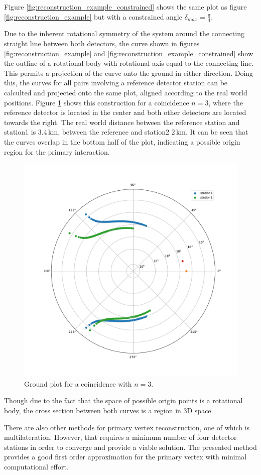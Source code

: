 \documentclass[abstract,toc,los,lof,english,10pt,glossary,acronyms]{jluthesis}
\begin{document}
Figure \ref{fig:reconstruction_example_constrained} shows the same plot as figure \ref{fig:reconstruction_example} but with a constrained angle $\delta_{max} = \frac{\pi}{4}$.

Due to the inherent rotational symmetry of the system around the connecting straight line between both detectors, the curve shown in figures \ref{fig:reconstruction_example} and \ref{fig:reconstruction_example_constrained} show the outline of a rotational body with rotational axis equal to the connecting line. This permits a projection of the curve onto the ground in either direction. Doing this, the curves for all pairs involving a reference detector station can be calculted and projected onto the same plot, aligned according to the real world positions. Figure \ref{fig:reconstruction_example_ground} shows this construction for a coincidence $n=3$, where the reference detector is located in the center and both other detectors are located towards the right. The real world distance between the reference station and station1 is $3.4\,\text{km}$, between the reference and station2 $2\,\text{km}$.
It can be seen that the curves overlap in the bottom half of the plot, indicating a possible origin region for the primary interaction.

\begin{figure}[ht!]
	\centering
	\includegraphics[width=0.4\linewidth]{data/example_plot_ground}
	\caption{Ground plot for a coincidence with $n=3$.}
	\label{fig:reconstruction_example_ground}
\end{figure}

Though due to the fact that the space of possible origin points is a rotational body, the cross section between both curves is a region in 3D space.

There are also other methods for primary vertex reconstruction, one of which is multilateration. However, that requires a minimum number of four detector stations in order to converge and provide a viable solution. The presented method provides a good first order approximation for the primary vertex with minimal computational effort.
\clearpage
\end{document}
